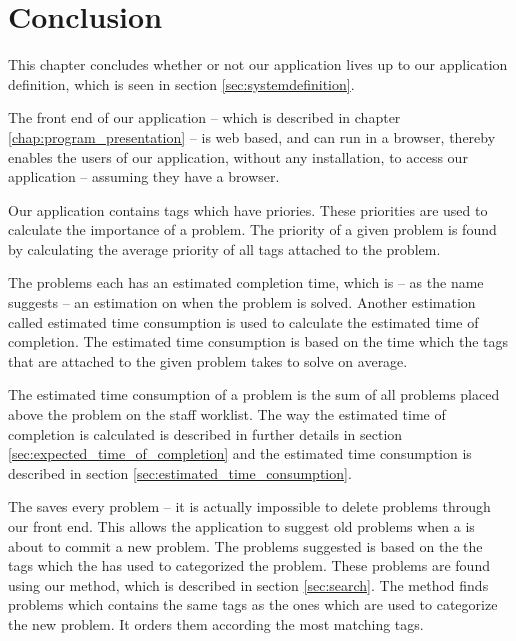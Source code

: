 \chapter{Conclusion}
\label{chap:conclusion}
\emptyTop{}
This chapter concludes whether or not our application lives up to our application definition, which is seen in section \ref{sec:systemdefinition}.

The front end of our application -- which is described in chapter \ref{chap:program_presentation} -- is web based, and can run in a browser, thereby enables the users of our application, without any installation, to access our application -- assuming they have a browser.

Our application contains tags which have priories.
These priorities are used to calculate the importance of a problem.
The priority of a given problem is found by calculating the average priority of all tags attached to the problem.

The problems each has an estimated completion time, which is -- as the name suggests -- an estimation on when the problem is solved.
Another estimation called estimated time consumption is used to calculate the estimated time of completion.
The estimated time consumption is based on the time which the tags that are attached to the given problem takes to solve on average.

The estimated time consumption of a problem is the sum of all problems placed above the problem on the staff worklist.%
The way the estimated time of completion is calculated is described in further details in section \ref{sec:expected_time_of_completion} and the estimated time consumption is described in section \ref{sec:estimated_time_consumption}.

The \hdesk[] saves every problem -- it is actually impossible to delete problems through our front end.
This allows the application to suggest old problems when a \aclient[] is about to commit a new problem.
The problems suggested is based on the the tags which the \aclient[] has used to categorized the problem.
These problems are found using our  method, which is described in section \ref{sec:search}.
The  method finds problems which contains the same tags  as the ones which are used to categorize the new problem. It orders them according the most matching tags.

